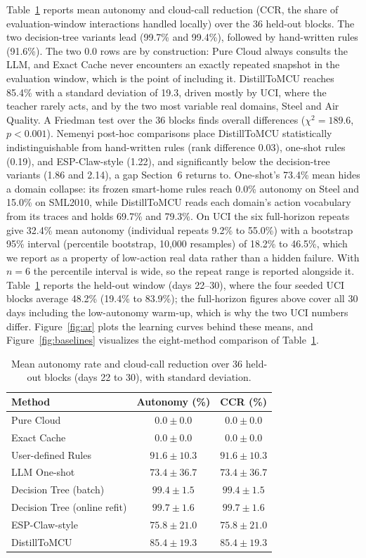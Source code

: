 \documentclass[11pt,a4paper]{article}
\begin{document}
Table~\ref{tab:ar} reports mean autonomy and cloud-call reduction (CCR, the
share of evaluation-window interactions handled locally) over the 36
held-out blocks. The two decision-tree variants lead (99.7\% and 99.4\%),
followed by hand-written rules (91.6\%). The two 0.0 rows are by
construction: Pure Cloud always consults the LLM, and Exact Cache never
encounters an exactly repeated snapshot in the evaluation window, which is
the point of including it. DistillToMCU reaches 85.4\% with a standard
deviation of 19.3, driven mostly by UCI, where the teacher rarely acts, and
by the two most variable real domains, Steel and Air Quality. A Friedman test
over the 36 blocks
finds overall differences ($\chi^2 = 189.6$, $p < 0.001$). Nemenyi post-hoc
comparisons place DistillToMCU statistically indistinguishable from
hand-written rules (rank difference 0.03), one-shot rules (0.19), and
ESP-Claw-style (1.22), and significantly below the decision-tree variants
(1.86 and 2.14), a gap Section~6 returns to. One-shot's 73.4\% mean hides a
domain collapse: its frozen smart-home rules reach 0.0\% autonomy on Steel
and 15.0\% on SML2010, while DistillToMCU reads each domain's action
vocabulary from its traces and holds 69.7\% and 79.3\%. On UCI the six
full-horizon repeats give 32.4\% mean autonomy (individual repeats 9.2\% to
55.0\%) with a bootstrap 95\% interval (percentile bootstrap, 10,000
resamples) of 18.2\% to 46.5\%, which we report as a property of low-action
real data rather than a hidden failure. With $n = 6$ the percentile interval
is wide, so the repeat range is reported alongside it. Table~\ref{tab:ar}
reports the held-out window (days 22--30), where the four seeded UCI blocks
average 48.2\% (19.4\% to 83.9\%); the full-horizon figures above cover all 30
days including the low-autonomy warm-up, which is why the two UCI numbers
differ.
Figure~\ref{fig:ar} plots the learning curves behind these means, and
Figure~\ref{fig:baselines} visualizes the eight-method comparison of
Table~\ref{tab:ar}.

\begin{table}[t]
\centering
\caption{Mean autonomy rate and cloud-call reduction over 36 held-out blocks
(days 22 to 30), with standard deviation.}
\label{tab:ar}
\begin{tabular}{lcc}
\toprule
Method & Autonomy (\%) & CCR (\%) \\
\midrule
Pure Cloud & $0.0 \pm 0.0$ & $0.0 \pm 0.0$ \\
Exact Cache & $0.0 \pm 0.0$ & $0.0 \pm 0.0$ \\
User-defined Rules & $91.6 \pm 10.3$ & $91.6 \pm 10.3$ \\
LLM One-shot & $73.4 \pm 36.7$ & $73.4 \pm 36.7$ \\
Decision Tree (batch) & $99.4 \pm 1.5$ & $99.4 \pm 1.5$ \\
Decision Tree (online refit) & $99.7 \pm 1.6$ & $99.7 \pm 1.6$ \\
ESP-Claw-style & $75.8 \pm 21.0$ & $75.8 \pm 21.0$ \\
DistillToMCU & $85.4 \pm 19.3$ & $85.4 \pm 19.3$ \\
\bottomrule
\end{tabular}
\end{table}
\end{document}
